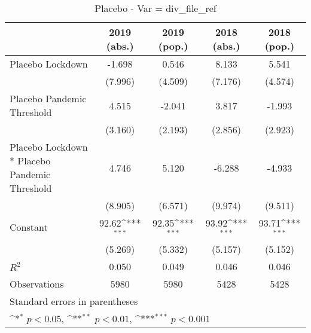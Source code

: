 \documentclass{article}
\begin{document}
{
\def\sym#1{\ifmmode^{#1}\else\(^{#1}\)\fi}
\begin{longtable}{l*{4}{c}}
\caption{Placebo - Var = div\_file\_ref}\\
\hline\hline\endfirsthead\hline\endhead\hline\endfoot\endlastfoot
                &\multicolumn{1}{c}{2019 (abs.)}&\multicolumn{1}{c}{2019 (pop.)}&\multicolumn{1}{c}{2018 (abs.)}&\multicolumn{1}{c}{2018 (pop.)}\\
\hline
Placebo Lockdown&   -1.698         &    0.546         &    8.133         &    5.541         \\
                &  (7.996)         &  (4.509)         &  (7.176)         &  (4.574)         \\
Placebo Pandemic Threshold&    4.515         &   -2.041         &    3.817         &   -1.993         \\
                &  (3.160)         &  (2.193)         &  (2.856)         &  (2.923)         \\
Placebo Lockdown * Placebo Pandemic Threshold&    4.746         &    5.120         &   -6.288         &   -4.933         \\
                &  (8.905)         &  (6.571)         &  (9.974)         &  (9.511)         \\
Constant        &    92.62\sym{***}&    92.35\sym{***}&    93.92\sym{***}&    93.71\sym{***}\\
                &  (5.269)         &  (5.332)         &  (5.157)         &  (5.152)         \\
\hline
\(R^{2}\)       &    0.050         &    0.049         &    0.046         &    0.046         \\
Observations    &     5980         &     5980         &     5428         &     5428         \\
\hline\hline
\multicolumn{5}{l}{\footnotesize Standard errors in parentheses}\\
\multicolumn{5}{l}{\footnotesize \sym{*} \(p<0.05\), \sym{**} \(p<0.01\), \sym{***} \(p<0.001\)}\\
\end{longtable}
}
\end{document}
